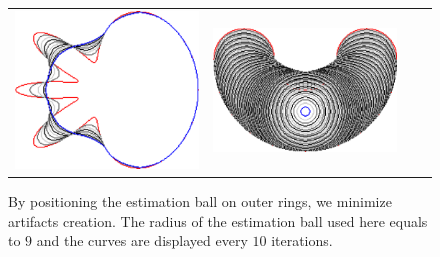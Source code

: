\begin{figure}
\begin{tabular}{p{3em}ccc}
\includegraphics[scale=0.25]{figures/chapter6/level-effect/flower/improve/len_pen0/radius-9/level9/summary.pdf} &
\includegraphics[scale=0.25]{figures/chapter6/level-effect/bean/improve/len_pen0/radius-9/level9/summary.pdf} \\[2em]
\end{tabular}
\caption{By positioning the estimation ball on outer rings, we minimize artifacts creation. The radius of the estimation ball used here equals to $9$ and the curves are displayed every $10$ iterations. \label{fig:mrings-r9-evolution}}
\end{figure}

